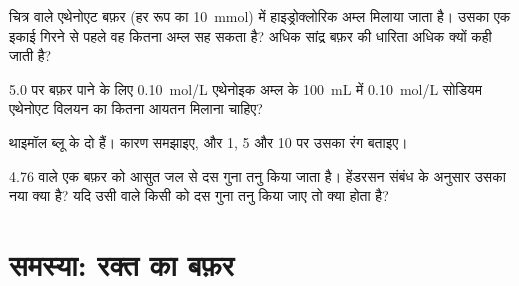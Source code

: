 \begin{exercise}[$\star\star\star$]\label{exo:g12:buffers-predominance:12}
चित्र वाले एथेनोएट बफ़र (हर रूप का \qty{10}{mmol}) में
हाइड्रोक्लोरिक अम्ल मिलाया जाता है। उसका  एक इकाई गिरने से पहले वह कितना अम्ल
सह सकता है? अधिक सांद्र बफ़र की धारिता अधिक क्यों कही
जाती है?
\end{exercise}

\begin{exercise}[$\star\star\star$]\label{exo:g12:buffers-predominance:13}
 5.0 पर बफ़र पाने के लिए \qty{0.10}{mol/L} एथेनोइक अम्ल के \qty{100}{mL} में
\qty{0.10}{mol/L} सोडियम एथेनोएट विलयन का कितना आयतन मिलाना
चाहिए?
\end{exercise}

\begin{exercise}[$\star\star\star$]\label{exo:g12:buffers-predominance:14}
थाइमॉल ब्लू के दो  हैं। कारण समझाइए, और  1, 5 और 10 पर उसका
रंग बताइए।
\end{exercise}

\begin{exercise}[$\star\star\star$]\label{exo:g12:buffers-predominance:15}
 4.76 वाले एक बफ़र को आसुत जल से दस गुना तनु किया जाता है। हेंडरसन संबंध
के अनुसार उसका नया  क्या है? यदि उसी  वाले किसी  को दस गुना तनु किया जाए तो क्या होता है?
\end{exercise}

\section{समस्या: रक्त का बफ़र}

